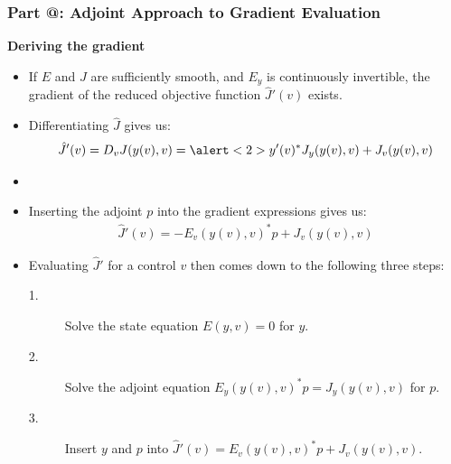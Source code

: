 \documentclass[9pt]{beamer}
\makeatletter
\newcommand*{\rom}[1]{\expandafter\@slowromancap\romannumeral #1@}
\makeatother
\begin{document}
\begin{frame}
\frametitle{\textbf{ Part \rom{2}:} Adjoint Approach to Gradient Evaluation}
\textbf{Deriving the gradient}
\begin{itemize}
\item<1->{If $E$ and $J$ are sufficiently smooth, and $E_y$ is continuously invertible, the gradient of the reduced objective function $\hat J'(v)$ exists.}
\item<1->{Differentiating $\hat J$ gives us: 
\begin{align*}
\hat J'(v)=D_vJ(y(v),v)=\alert<2>{y'(v)^*}J_y(y(v),v)+J_v(y(v),v)
\end{align*}}
\item<3->{ 
}
\item<7->{Inserting the adjoint $p$ into the gradient expressions gives us:
\begin{align*}
\hat J'(v) = -E_v(y(v),v)^*p+J_v(y(v),v)
\end{align*}}
\end{itemize}
\begin{itemize}
\item<8->{Evaluating $\hat J'$ for a control $v$ then comes down to the following three steps:
\begin{description}
\item[1.]{Solve the state equation $E(y,v)=0$ for $y$.}
\item[2.]{Solve the adjoint equation $E_y(y(v),v)^*p = J_y(y(v),v)$ for $p$.}
\item[3.]{Insert $y$ and $p$ into $\hat J'(v)=E_v(y(v),v)^*p +J_v(y(v),v)$.}
\end{description}}
\end{itemize}
\end{frame}
\end{document}
